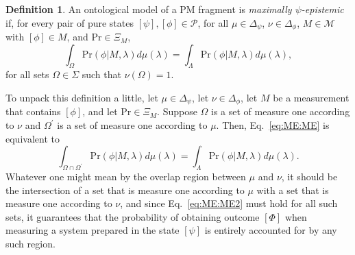 \documentclass[DIV=calc,paper=a4,fontsize=11pt,twocolumn]{scrartcl} %
\theoremstyle{definition}
\newtheorem{definition}{Definition}[section]
\theoremstyle{plain}
\newcommand{\Proj}[1]{\ensuremath{\left [ #1 \right ]}}
\begin{document}
\begin{definition}
\label{def:ME:ME}
An ontological model of a PM fragment is \emph{maximally
$\psi$-epistemic} if, for every pair of pure states $\Proj{\psi},
\Proj{\phi} \in \mathcal{P}$, for all $\mu \in \Delta_{\psi}$, $\nu
\in \Delta_{\phi}$, $M \in \mathcal{M}$ with $\Proj{\phi} \in M$,
and $\text{Pr} \in \Xi_M$,
\begin{equation}
\label{eq:ME:ME}
\int_{\Omega} \text{Pr}(\phi|M,\lambda) d\mu(\lambda) =
\int_{\Lambda} \text{Pr}(\phi|M,\lambda) d\mu(\lambda),
\end{equation}
for all sets $\Omega \in \Sigma$ such that $\nu(\Omega) = 1$.
\end{definition}

To unpack this definition a little, let $\mu \in \Delta_{\psi}$, let
$\nu \in \Delta_{\phi}$, let $M$ be a measurement that contains
$\Proj{\phi}$, and let $\text{Pr} \in \Xi_M$.  Suppose $\Omega$ is a
set of measure one according to $\nu$ and $\Omega^{\prime}$ is a set
of measure one according to $\mu$.  Then, Eq.~\eqref{eq:ME:ME} is
equivalent to
\begin{equation}
\label{eq:ME:ME2}
\int_{\Omega \cap \Omega^{\prime}} \text{Pr}(\phi|M,\lambda) d\mu(\lambda) =
\int_{\Lambda} \text{Pr}(\phi|M,\lambda) d\mu(\lambda).
\end{equation}
Whatever one might mean by the overlap region between $\mu$ and $\nu$,
it should be the intersection of a set that is measure one according
to $\mu$ with a set that is measure one according to $\nu$, and since
Eq.~\eqref{eq:ME:ME2} must hold for all such sets, it guarantees that
the probability of obtaining outcome $\Proj{\Phi}$ when measuring a
system prepared in the state $\Proj{\psi}$ is entirely accounted for
by any such region.
\end{document}
